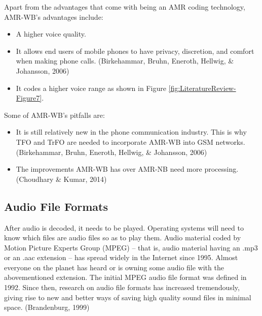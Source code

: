 \documentclass[12pt,svgnames,smaller]{article} %
\begin{document}
\begin{enumerate}
		Apart from the advantages that come with being an AMR coding technology, AMR-WB’s advantages include:
		
		\begin{itemize}
			\item A higher voice quality.
			\item It allows end users of mobile phones to have privacy, discretion, and comfort when making phone calls. (Birkehammar, Bruhn, Eneroth, Hellwig, \& Johansson, 2006)
			\item It codes a higher voice range as shown in Figure \ref{fig:LiteratureReview-Figure7}. 
		\end{itemize}
		
		Some of AMR-WB’s pitfalls are:
		
		\begin{itemize}
			\item It is still relatively new in the phone communication industry. This is why TFO and TrFO are needed to incorporate AMR-WB into GSM networks. (Birkehammar, Bruhn, Eneroth, Hellwig, \& Johansson, 2006)
			\item The improvements AMR-WB has over AMR-NB need more processing. (Choudhary \& Kumar, 2014)
		\end{itemize}
		
		
	\end{enumerate}
	
	
	\subsection{Audio File Formats}
	
	After audio is decoded, it needs to be played. Operating systems will need to know which files are audio files so as to play them. Audio material coded by Motion Picture Experts Group (MPEG) – that is, audio material having an .mp3 or an .aac extension – has spread widely in the Internet since 1995. Almost everyone on the planet has heard or is owning some audio file with the abovementioned extension. The initial MPEG audio file format was defined in 1992. Since then, research on audio file formats has increased tremendously, giving rise to new and better ways of saving high quality sound files in minimal space. (Brandenburg, 1999)
	
\end{document}
